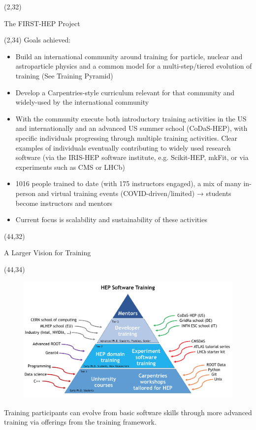 \documentclass[final]{beamer}
\begin{document}
\begin{frame}{}
\begin{textblock}{38.0}(2,32)
\begin{block}{The FIRST-HEP Project}
\begin{textblock}{38.0}(2,34)
Goals achieved:
\begin{itemize}
\item Build an international community around training for particle, nuclear and astroparticle physics and a common model for a multi-step/tiered evolution of training (See Training Pyramid)
\item Develop a Carpentries-style curriculum relevant for that community and widely-used by the international community
\item With the community execute both introductory training activities in the US and internationally and an advanced US summer school (CoDaS-HEP), with specific individuals progressing through multiple training activities. Clear examples of individuals eventually contributing to widely used research software (via the IRIS-HEP software institute, e.g. Scikit-HEP, mkFit, or via experiments such as CMS or LHCb)
\item 1016 people trained to date (with 175 instructors engaged), a mix of many in-person and virtual training events (COVID-driven/limited) → students become instructors and mentors
\item Current focus is scalability and sustainability of these activities
\end{itemize}
\end{textblock}
\end{block}
\end{textblock}



\begin{textblock}{38.0}(44,32)
\begin{block}{A Larger Vision for Training}
\begin{textblock}{38.0}(44,34)
\begin{figure}[tbph]
\centering
\includegraphics[width=1.00\textwidth]{images/Training-Pyramid.png}
\end{figure}
Training participants can evolve from basic software skills through more advanced training via offerings from the training framework.
\end{textblock}
\end{block}
\end{textblock}


\end{frame}
\end{document}
